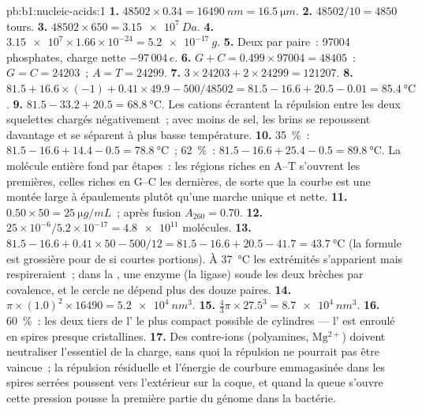 \begin{solution}{pb:b1:nucleic-acids:1}
\textbf{1.} $\num{48502}\times 0.34 = \qty{16490}{nm} = \qty{16.5}{\micro m}$.
\textbf{2.} $\num{48502}/10 = 4850$ tours.
\textbf{3.} $\num{48502}\times 650 = \qty{3.15e7}{Da}$.
\textbf{4.} $\num{3.15e7}\times 1.66\times 10^{-24} = \qty{5.2e-17}{g}$.
\textbf{5.} Deux par paire~: \num{97004} phosphates, charge nette $-97\,004\,e$.
\textbf{6.} $G + C = 0.499\times\num{97004} = \num{48405}$~: $G = C =
\num{24203}$~; $A = T = \num{24299}$.
\textbf{7.} $3\times\num{24203} + 2\times\num{24299} = \num{121207}$.
\textbf{8.} $81.5 + 16.6\times(-1) + 0.41\times 49.9 - 500/48502 =
81.5 - 16.6 + 20.5 - 0.01 = \qty{85.4}{\celsius}$.
\textbf{9.} $81.5 - 33.2 + 20.5 = \qty{68.8}{\celsius}$. Les cations
écrantent la répulsion entre les deux squelettes chargés négativement~;
avec moins de sel, les brins se repoussent davantage et se séparent à
plus basse température.
\textbf{10.} \qty{35}{\%}~: $81.5 - 16.6 + 14.4 - 0.5 =
\qty{78.8}{\celsius}$~; \qty{62}{\%}~: $81.5 - 16.6 + 25.4 - 0.5 =
\qty{89.8}{\celsius}$. La molécule entière fond par étapes~: les régions
riches en A--T s'ouvrent les premières, celles riches en G--C les
dernières, de sorte que la courbe est une montée large à épaulements
plutôt qu'une marche unique et nette.
\textbf{11.} $0.50\times 50 = \qty{25}{\micro g/mL}$~; après fusion
$A_{260} = 0.70$.
\textbf{12.} $25\times 10^{-6}/5.2\times 10^{-17} = \num{4.8e11}$ molécules.
\textbf{13.} $81.5 - 16.6 + 0.41\times 50 - 500/12 = 81.5 - 16.6 + 20.5
- 41.7 = \qty{43.7}{\celsius}$ (la formule est grossière pour de si
courtes portions). À \qty{37}{\celsius} les extrémités s'apparient mais
respireraient~; dans la , une enzyme (la ligase) soude les deux
brèches par covalence, et le cercle ne dépend plus des douze paires.
\textbf{14.} $\pi\times(1.0)^2\times\num{16490} = \qty{5.2e4}{nm^3}$.
\textbf{15.} $\frac{4}{3}\pi\times 27.5^3 = \qty{8.7e4}{nm^3}$.
\textbf{16.} \qty{60}{\%}~: les deux tiers de l' le plus
compact possible de cylindres --- l' est enroulé en spires presque
cristallines.
\textbf{17.} Des contre-ions (polyamines, $\mathrm{Mg^{2+}}$) doivent
neutraliser l'essentiel de la charge, sans quoi la répulsion ne pourrait
pas être vaincue~; la répulsion résiduelle et l'énergie de courbure
emmagasinée dans les spires serrées poussent vers l'extérieur sur la
coque, et quand la queue s'ouvre cette pression pousse la première
partie du génome dans la bactérie.

\end{solution}
